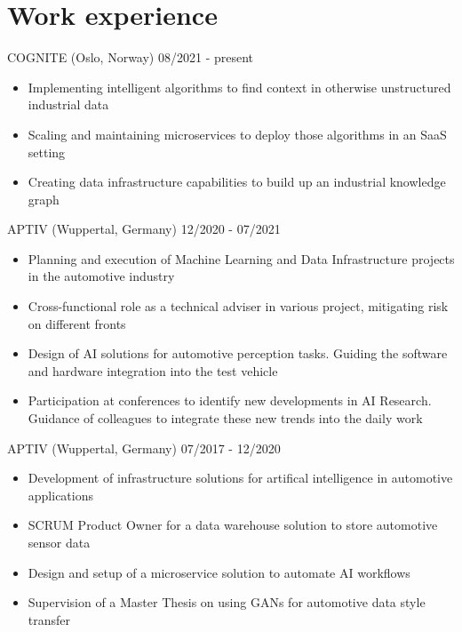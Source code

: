 \documentclass[singlesided,
               paper=a4,
               fontsize=10pt
              ]{my-resume}
\begin{document}
\section[\faBriefcase]{Work experience}
	{COGNITE (Oslo, Norway)}
	{08/2021 - present}
    {\begin{itemize}[leftmargin=2em]
        \item Implementing intelligent algorithms to find context in otherwise unstructured industrial data
        \item Scaling and maintaining microservices to deploy those algorithms in an SaaS setting
        \item Creating data infrastructure capabilities to build up an industrial knowledge graph
    \end{itemize}}
%
    {APTIV (Wuppertal, Germany)}
    {12/2020 - 07/2021}
    {\begin{itemize}[leftmargin=2em]
        \item Planning and execution of Machine Learning and Data Infrastructure projects in the automotive industry
        \item Cross-functional role as a technical adviser in various project, mitigating risk on different fronts
        \item Design of AI solutions for automotive perception tasks. Guiding the software and hardware integration into the test vehicle
        \item Participation at conferences to identify new developments in AI Research. Guidance of colleagues to integrate these new trends into the daily work
    \end{itemize}}
%
    {APTIV (Wuppertal, Germany)}
    {07/2017 - 12/2020}
    {\begin{itemize}[leftmargin=2em]
        \item Development of infrastructure solutions for artifical intelligence in automotive applications 
        \item SCRUM Product Owner for a data warehouse solution to store automotive sensor data 
        \item Design and setup of a microservice solution to automate AI workflows
        \item Supervision of a Master Thesis on using GANs for automotive data style transfer
    \end{itemize}}
\end{document}
